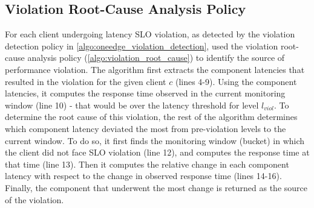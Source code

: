 \subsection{Violation Root-Cause Analysis Policy}
\label{sec:oneedge_root_cause_chapter}
For each client undergoing latency SLO violation, as detected by the violation detection policy in \cref{algo:oneedge_violation_detection}, \oneedge{} used the violation root-cause analysis policy (\cref{algo:violation_root_cause}) to identify the source of performance violation. The algorithm first extracts the component latencies that resulted in the violation for the given client $c$ (lines 4-9). Using the component latencies, it computes the response time observed in the current monitoring window (line 10) - that would be over the latency threshold for level $l_{viol}$. To determine the root cause of this violation, the rest of the algorithm determines which component latency deviated the most from pre-violation levels to the current window. To do so, it first finds the monitoring window (bucket) in which the client did not face SLO violation (line 12), and computes the response time at that time (line 13). Then it computes the relative change in each component latency with respect to the change in observed response time (lines 14-16). Finally, the component that underwent the most change is returned as the source of the violation.

